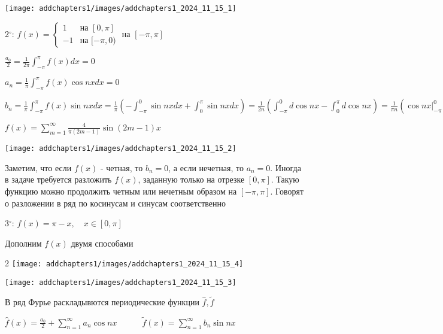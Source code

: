 \documentclass[12pt]{article}
\begin{document}
    \begin{center}
        \texttt{[image: addchapters1/images/addchapters1\_2024\_11\_15\_1]}
    \end{center}

    2$^\circ$: $f(x) = \begin{cases}1 & \text{на } [0, \pi] \\ -1 & \text{на } [-\pi, 0)\end{cases}$ на $[-\pi, \pi]$

    $\frac{a_0}{2} = \frac{1}{2\pi} \int_{-\pi}^\pi f(x) dx = 0$

    $a_n = \frac{1}{\pi} \int_{-\pi}^\pi f(x) \cos nx dx = 0$

    $b_n = \frac{1}{\pi} \int_{-\pi}^\pi f(x) \sin nx dx = \frac{1}{\pi} \left(-\int_{-\pi}^0 \sin nx dx + \int_0^\pi \sin nx dx\right) = 
    \frac{1}{2n} \left(\int_{-\pi}^0 d\cos nx - \int_0^\pi d\cos nx\right) = \frac{1}{\pi n} \left(\cos nx \Big|_{-\pi}^0 - \cos nx \Big|_0^\pi\right) = 
    \frac{1}{\pi n} (1 - \cos \pi n - \cos \pi n + 1) = \frac{2}{\pi n}(1 - \cos \pi n) = \frac{4}{\pi (2m - 1)}$

    $f(x) = \sum_{m = 1}^\infty \frac{4}{\pi (2m - 1)} \sin (2m - 1) x$

    \begin{center}
        \texttt{[image: addchapters1/images/addchapters1\_2024\_11\_15\_2]}
    \end{center}

    \Nota Заметим, что если $f(x)$ - четная, то $b_n = 0$, а если нечетная, то $a_n = 0$. Иногда в задаче
    требуется разложить $f(x)$, заданную только на отрезке $[0, \pi]$. Такую функцию можно продолжить четным
    или нечетным образом на $[-\pi, \pi]$. Говорят о разложении в ряд по косинусам и синусам соответственно

    3$^\circ$: $f(x) = \pi - x, \quad x \in [0, \pi]$

    Дополним $f(x)$ двумя способами

    \begin{multicols}{2}
        \texttt{[image: addchapters1/images/addchapters1\_2024\_11\_15\_4]}

        \texttt{[image: addchapters1/images/addchapters1\_2024\_11\_15\_3]}
    \end{multicols}

    В ряд Фурье раскладывются периодические функции $\hat{f}, \tilde{f}$

    \Lab $\hat{f}(x) = \frac{a_0}{2} + \sum_{n = 1}^\infty a_n \cos nx \quad\quad\quad \tilde{f}(x) = \sum_{n = 1}^\infty b_n \sin nx$
\end{document}
